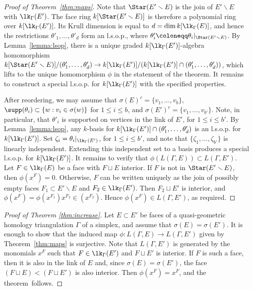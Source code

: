 \begin{proof}[Proof of Theorem~\ref{thm:maps}]
Note that $\Star(E' \smallsetminus E)$ is the join of $E' \smallsetminus E$ with $\lk_{\Gamma}(E')$. The face ring $k[\Star(E' \smallsetminus E)]$ is therefore a polynomial ring over $k[\lk_\Gamma(E')]$. Its Krull dimension is equal to $d = \dim k[\lk_\Gamma(E)]$, and hence the restrictions $\theta'_1, \ldots, \theta'_d$ form an l.s.o.p., where $\theta'_i  \coloneqq  \theta_i|_{\Star(E' \smallsetminus E)}$.  By Lemma~\ref{lemma:lsop}, there is a unique graded $k[\lk_\Gamma(E')]$-algebra homomorphism $k[\Star(E' \smallsetminus E)]/(\theta'_1, \ldots, \theta'_d) \to k[\lk_\Gamma(E')]/ (k[\lk_\Gamma(E')] \cap (\theta'_1, \ldots, \theta'_d))$, which lifts to the unique homomorphism $\phi$ in the statement of the theorem. It remains to construct a special l.s.o.p. for $k[\lk_\Gamma(E')]$ with the specified properties.

After reordering, we may assume that
$\sigma(E)^c = \{ v_1, \ldots, v_b\},$ $\supp(\theta_i) \subset \{ w : v_i \in \sigma(w) \}$ for $1 \leq i \leq b$, and $\sigma(E')^c = \{v_1, \ldots, v_{b'}\}.$
Note, in particular, that $\theta'_i$ is supported on vertices in the link of $E'$, for $1 \leq i \leq b'$. By Lemma~\ref{lemma:lsop}, any $k$-basis for $k[\lk_\Gamma(E')] \cap (\theta'_1, \ldots, \theta'_d)$ is an l.s.o.p. for $k[\lk_\Gamma(E')]$.  Set $\zeta_i = \theta_i|_{\lk_\Gamma(E')}$, for $1 \leq i \leq b'$, and note that $\{\zeta_1, \ldots, \zeta_{b'}\}$ is linearly independent.  Extending this independent set to a basis produces a special l.s.o.p. for $k[\lk_\Gamma(E')]$.  It remains to verify that $\phi(L(\Gamma, E)) \subset L(\Gamma, E')$. Let $F \in \lk_{\Gamma}(E)$ be a face with $F \sqcup E$ interior. If $F$ is not in $\Star(E' \smallsetminus E)$, then $\phi(x^F) = 0$. Otherwise, $F$ can be written uniquely as the join of possibly empty faces $F_1 \subset E' \smallsetminus E$ and $F_2 \in \lk_{\Gamma}(E')$. Then $F_2 \sqcup E'$ is interior, and $\phi(x^F) = \phi(x^{F_1})x^{F_2} \in (x^{F_2})$. Hence $\phi(x^F) \in L(\Gamma,E')$, as required.
\end{proof}





\begin{proof}[Proof of Theorem \ref{thm:increase}]
Let $E \subset E'$ be faces of a 
quasi-geometric homology triangulation $\Gamma$ of a simplex, and assume that $\sigma(E) = \sigma(E')$. It is enough to show that the induced map $\phi \colon L(\Gamma, E) \to L(\Gamma,E')$ given by Theorem~\ref{thm:maps} is surjective. Note that $L(\Gamma,E')$ is generated by the monomials $x^F$ such that $F \in \lk_\Gamma(E')$ and $F \sqcup E'$ is interior.  If $F$ is such a face, then it is also in the link of $E$ and, since $\sigma(E) = \sigma(E')$, the face $(F \sqcup E) < (F \sqcup E')$ is also interior.  Then $\phi(x^F) = x^F$, and the theorem~follows. \end{proof}

